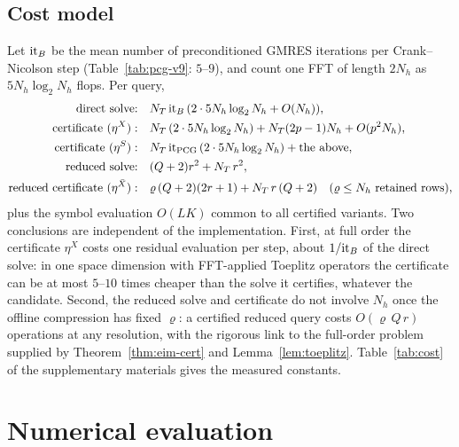 \documentclass[hidelinks]{siamart251216}
\begin{document}
\subsection{Cost model}
\label{ssec:cost}
Let ${\rm it}_B$ be the mean number of preconditioned GMRES iterations per Crank--Nicolson step
(Table~\ref{tab:pcg-v9}: $5$--$9$), and count one FFT of length $2N_h$ as $5N_h\log_2N_h$
flops.  Per query,
\begin{align*}
 \text{direct solve:}&\quad N_T\,{\rm it}_B\,(2\cdot5N_h\log_2N_h+O(N_h)),\\
 \text{certificate }(\eta^X):&\quad N_T\,(2\cdot5N_h\log_2N_h)+N_T(2p-1)N_h+O(p^2N_h),\\
 \text{certificate }(\eta^S):&\quad N_T\,{\rm it}_{\rm PCG}\,(2\cdot5N_h\log_2N_h)+\text{the above},\\
 \text{reduced solve:}&\quad (Q+2)r^2+N_T\,r^2,\\
 \text{reduced certificate }(\eta^{\bar X}):&\quad \varrho\,(Q+2)(2r+1)+N_T\,r\,(Q+2)\quad(\varrho\le N_h\ \text{retained rows}),
\end{align*}
plus the symbol evaluation $O(LK)$ common to all certified variants.  Two conclusions are
independent of the implementation.  First, at full order the certificate $\eta^X$ costs one
residual evaluation per step, about $1/{\rm it}_B$ of the direct solve: in one space dimension
with FFT-applied Toeplitz operators the certificate can be at most $5$--$10$ times cheaper than
the solve it certifies, whatever the candidate.  Second, the reduced solve and certificate do not
involve $N_h$ once the offline compression has fixed $\varrho$: a certified reduced query costs
$O(\varrho\,Q\,r)$ operations at any resolution, with the rigorous link to the full-order problem
supplied by Theorem~\ref{thm:eim-cert} and Lemma~\ref{lem:toeplitz}.  Table~\ref{tab:cost} of the
supplementary materials gives the measured constants.

\section{Numerical evaluation}
\label{sec:numerics}
\end{document}
